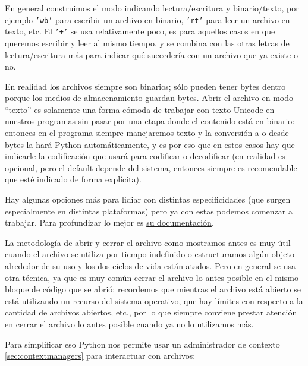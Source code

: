 En general construimos el modo indicando lectura/escritura y binario/texto, por ejemplo \texttt{'wb'} para escribir un archivo en binario, \texttt{'rt'} para leer un archivo en texto, etc. El \texttt{'+'} se usa relativamente poco, es para aquellos casos en que queremos escribir y leer al mismo tiempo, y se combina con las otras letras de lectura/escritura más para indicar qué suecedería con un archivo que ya existe o no.


En realidad los archivos siempre son binarios; sólo pueden tener bytes dentro porque los medios de almacenamiento guardan bytes. Abrir el archivo en modo ``texto'' es solamente una forma cómoda de trabajar con texto Unicode en nuestros programas sin pasar por una etapa donde el contenido está en binario: entonces en el programa siempre manejaremos texto y la conversión a o desde bytes la hará Python automáticamente, y es por eso que en estos casos hay que indicarle la codificación que usará para codificar o decodificar (en realidad es opcional, pero el default depende del sistema, entonces siempre es recomendable que esté indicado de forma explícita).


Hay algunas opciones más para lidiar con distintas especificidades (que surgen especialmente en distintas plataformas) pero ya con estas podemos comenzar a trabajar. Para profundizar lo mejor es \href{https://docs.python.org/es/dev/library/functions.html#open}{su documentación}.

La metodología de abrir y cerrar el archivo como mostramos antes es muy útil cuando el archivo se utiliza por tiempo indefinido o estructuramos algún objeto alrededor de su uso y los dos ciclos de vida están atados. Pero en general se usa otra técnica, ya que es muy común cerrar el archivo lo antes posible en el mismo bloque de código que se abrió; recordemos que mientras el archivo está abierto se está utilizando un recurso del sistema operativo, que hay límites con respecto a la cantidad de archivos abiertos, etc., por lo que siempre conviene prestar atención en cerrar el archivo lo antes posible cuando ya no lo utilizamos más.

Para simplificar eso Python nos permite usar un administrador de contexto \ref{sec:contextmanagers} para interactuar con archivos:


